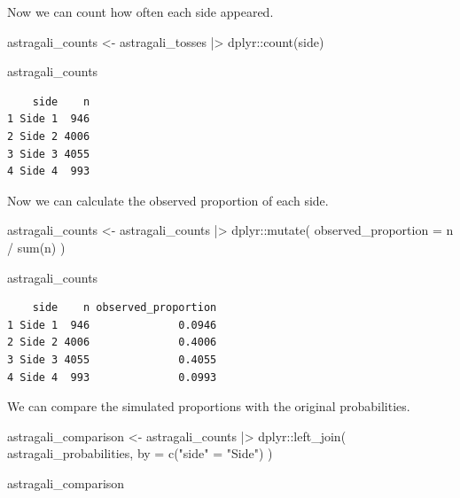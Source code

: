 \documentclass[
  letterpaper,
  DIV=11,
  numbers=noendperiod]{scrreprt}
\newenvironment{Shaded}{\begin{snugshade}}{\end{snugshade}}
\newcommand{\AttributeTok}[1]{\textcolor[rgb]{0.40,0.45,0.13}{#1}}
\newcommand{\FunctionTok}[1]{\textcolor[rgb]{0.28,0.35,0.67}{#1}}
\newcommand{\NormalTok}[1]{\textcolor[rgb]{0.00,0.23,0.31}{#1}}
\newcommand{\OtherTok}[1]{\textcolor[rgb]{0.00,0.23,0.31}{#1}}
\newcommand{\SpecialCharTok}[1]{\textcolor[rgb]{0.37,0.37,0.37}{#1}}
\newcommand{\StringTok}[1]{\textcolor[rgb]{0.13,0.47,0.30}{#1}}
\begin{document}
Now we can count how often each side appeared.

\begin{Shaded}
\begin{Highlighting}[]
\NormalTok{astragali\_counts }\OtherTok{\textless{}{-}}\NormalTok{ astragali\_tosses }\SpecialCharTok{|\textgreater{}}
\NormalTok{  dplyr}\SpecialCharTok{::}\FunctionTok{count}\NormalTok{(side)}

\NormalTok{astragali\_counts}
\end{Highlighting}
\end{Shaded}

\begin{verbatim}
    side    n
1 Side 1  946
2 Side 2 4006
3 Side 3 4055
4 Side 4  993
\end{verbatim}

Now we can calculate the observed proportion of each side.

\begin{Shaded}
\begin{Highlighting}[]
\NormalTok{astragali\_counts }\OtherTok{\textless{}{-}}\NormalTok{ astragali\_counts }\SpecialCharTok{|\textgreater{}}
\NormalTok{  dplyr}\SpecialCharTok{::}\FunctionTok{mutate}\NormalTok{(}
    \AttributeTok{observed\_proportion =}\NormalTok{ n }\SpecialCharTok{/} \FunctionTok{sum}\NormalTok{(n)}
\NormalTok{  )}

\NormalTok{astragali\_counts}
\end{Highlighting}
\end{Shaded}

\begin{verbatim}
    side    n observed_proportion
1 Side 1  946              0.0946
2 Side 2 4006              0.4006
3 Side 3 4055              0.4055
4 Side 4  993              0.0993
\end{verbatim}

We can compare the simulated proportions with the original
probabilities.

\begin{Shaded}
\begin{Highlighting}[]
\NormalTok{astragali\_comparison }\OtherTok{\textless{}{-}}\NormalTok{ astragali\_counts }\SpecialCharTok{|\textgreater{}}
\NormalTok{  dplyr}\SpecialCharTok{::}\FunctionTok{left\_join}\NormalTok{(}
\NormalTok{    astragali\_probabilities,}
    \AttributeTok{by =} \FunctionTok{c}\NormalTok{(}\StringTok{"side"} \OtherTok{=} \StringTok{"Side"}\NormalTok{)}
\NormalTok{  )}

\NormalTok{astragali\_comparison}
\end{Highlighting}
\end{Shaded}
\end{document}
